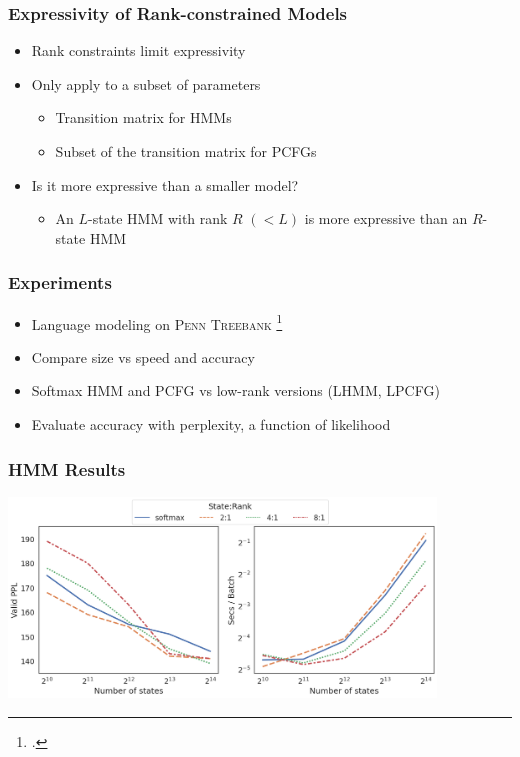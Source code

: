 \documentclass{beamer}
\begin{document}
\begin{frame}
\frametitle{Expressivity of Rank-constrained Models}
\begin{itemize}
\item Rank constraints limit expressivity
\vspace{1em}
\item Only apply to a subset of parameters
    \begin{itemize}
    \item Transition matrix for HMMs
    \item Subset of the transition matrix for PCFGs
    \end{itemize}
\vspace{1em}
\item Is it more expressive than a smaller model?
    \begin{itemize}
    \item An $L$-state HMM with rank $R$ $(< L)$ is more
        expressive than an $R$-state HMM
    \end{itemize}
\end{itemize}
\end{frame}

\begin{frame}
\frametitle{Experiments}
\begin{itemize}
\item Language modeling on \textsc{Penn Treebank} \footcite{ptb}
\vspace{1em}
\item Compare size vs speed and accuracy
\vspace{1em}
\item Softmax HMM and PCFG vs low-rank versions (LHMM, LPCFG)
\vspace{1em}
\item Evaluate accuracy with perplexity, a function of likelihood
\end{itemize}
\end{frame}

\begin{frame}
\frametitle{HMM Results}
\centering
\includegraphics[height=2.1in]{imgs/hmm/lhmm-speed-acc-joint.png}
\end{frame}
\end{document}
